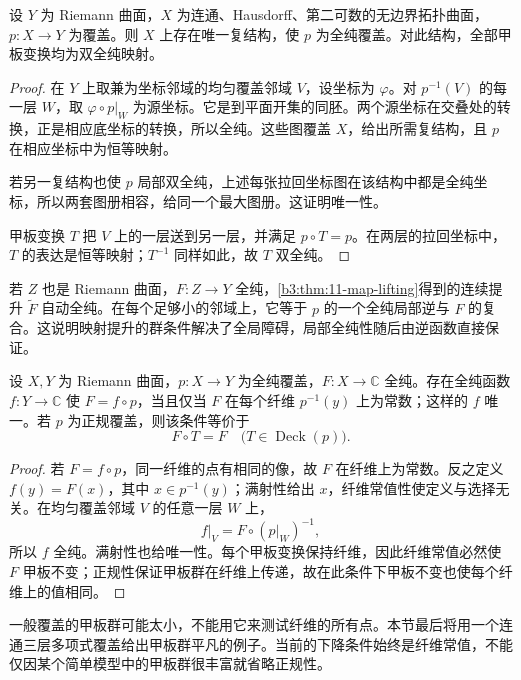 \begin{proposition}[覆盖上的复结构]\label{b3:prop:11-pullback-structure}
设 \(Y\) 为 Riemann 曲面，\(X\) 为连通、Hausdorff、第二可数的无边界拓扑曲面，\(p:X\to Y\) 为覆盖。则 \(X\) 上存在唯一复结构，使 \(p\) 为全纯覆盖。对此结构，全部甲板变换均为双全纯映射。
\end{proposition}
\begin{proof}
在 \(Y\) 上取兼为坐标邻域的均匀覆盖邻域 \(V\)，设坐标为 \(\varphi\)。对 \(p^{-1}(V)\) 的每一层 \(W\)，取 \(\varphi\circ p|_W\) 为源坐标。它是到平面开集的同胚。两个源坐标在交叠处的转换，正是相应底坐标的转换，所以全纯。这些图覆盖 \(X\)，给出所需复结构，且 \(p\) 在相应坐标中为恒等映射。

若另一复结构也使 \(p\) 局部双全纯，上述每张拉回坐标图在该结构中都是全纯坐标，所以两套图册相容，给同一个最大图册。这证明唯一性。

甲板变换 \(T\) 把 \(V\) 上的一层送到另一层，并满足 \(p\circ T=p\)。在两层的拉回坐标中，\(T\) 的表达是恒等映射；\(T^{-1}\) 同样如此，故 \(T\) 双全纯。
\end{proof}
若 \(Z\) 也是 Riemann 曲面，\(F:Z\to Y\) 全纯，\cref{b3:thm:11-map-lifting}得到的连续提升 \(\widetilde F\) 自动全纯。在每个足够小的邻域上，它等于 \(p\) 的一个全纯局部逆与 \(F\) 的复合。这说明映射提升的群条件解决了全局障碍，局部全纯性随后由逆函数直接保证。

\begin{proposition}[全纯函数的下降]\label{b3:prop:11-holomorphic-descent}
设 \(X,Y\) 为 Riemann 曲面，\(p:X\to Y\) 为全纯覆盖，\(F:X\to\mathbb C\) 全纯。存在全纯函数 \(f:Y\to\mathbb C\) 使 \(F=f\circ p\)，当且仅当 \(F\) 在每个纤维 \(p^{-1}(y)\) 上为常数；这样的 \(f\) 唯一。若 \(p\) 为正规覆盖，则该条件等价于
\[
 F\circ T=F\quad\bigl(T\in\operatorname{Deck}(p)\bigr).
\]
\end{proposition}
\begin{proof}
若 \(F=f\circ p\)，同一纤维的点有相同的像，故 \(F\) 在纤维上为常数。反之定义 \(f(y)=F(x)\)，其中 \(x\in p^{-1}(y)\)；满射性给出 \(x\)，纤维常值性使定义与选择无关。在均匀覆盖邻域 \(V\) 的任意一层 \(W\) 上，
\[
 f|_V=F\circ(p|_W)^{-1},
\]
所以 \(f\) 全纯。满射性也给唯一性。每个甲板变换保持纤维，因此纤维常值必然使 \(F\) 甲板不变；正规性保证甲板群在纤维上传递，故在此条件下甲板不变也使每个纤维上的值相同。
\end{proof}
一般覆盖的甲板群可能太小，不能用它来测试纤维的所有点。本节最后将用一个连通三层多项式覆盖给出甲板群平凡的例子。当前的下降条件始终是纤维常值，不能仅因某个简单模型中的甲板群很丰富就省略正规性。

